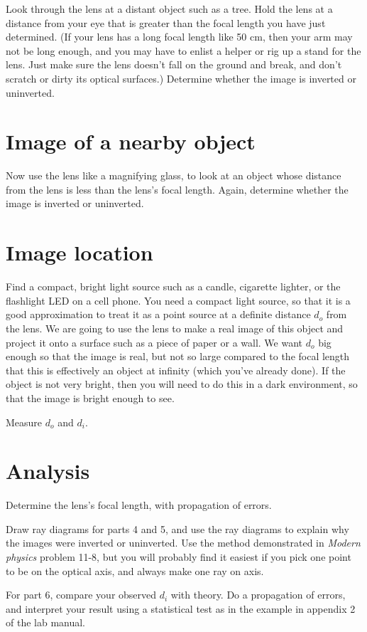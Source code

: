 Look through the lens at a distant object such as a tree. Hold
the lens at a distance from your eye that is greater than the focal
length you have just determined. (If your lens has a long focal length
like 50 cm, then your arm may not be long enough, and you may have to
enlist a helper or rig up a stand for the lens. Just make sure the lens
doesn't fall on the ground and break, and don't scratch or dirty its
optical surfaces.) Determine whether the image is inverted or uninverted.

\section{Image of a nearby object}

Now use the lens like a magnifying glass, to look at an object whose
distance from the lens is less than the lens's focal length.
Again, determine whether the image is inverted or uninverted.

\section{Image location}

Find a compact, bright light source such as a candle, cigarette lighter,
or the flashlight LED on a cell phone. You need a compact light source,
so that it is a good approximation to treat it as a point source at a definite
distance $d_o$ from the lens. We are going to use the lens to make a real
image of this object and project it onto a surface such as a piece of paper
or a wall. We want $d_o$ big enough so that the image is real, but not
so large compared to the focal length that this is effectively an object
at infinity (which you've already done). If the object is not very bright,
then you will need to do this in a dark environment, so that the image is
bright enough to see.

Measure $d_o$ and $d_i$.

\section{Analysis}

Determine the lens's focal length, with propagation of errors.

Draw ray diagrams for parts 4 and 5, and use the ray diagrams to explain
why the images were inverted or uninverted. Use the method demonstrated
in \emph{Modern physics} problem 11-8, but you will probably find it
easiest if you pick one point to be on the optical axis, and always make
one ray on axis.

For part 6, compare your observed $d_i$ with theory. Do a
propagation of errors, and interpret your result using a statistical
test as in the example in appendix 2 of the lab manual.



